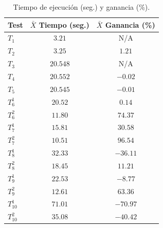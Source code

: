 \begin{table}[!htb]
\renewcommand{\arraystretch}{1.3}
\begin{center}
\begin{tabular}{|l|c|c|}
\hline
  \textbf{Test}& \textbf{$\bar{X}$ Tiempo (seg.)} & \textbf{$\bar{X}$ Ganancia (\%)} \\ \hline
   $T_1$ & $3.21$  & N/A\\ \hline 
   $T_2$ & $3.25$  & $1.21$   \\ \hline 
   $T_3$ & $20.548$ & N/A   \\ \hline 
   $T_4$ & $20.552$ & $-0.02$ \\ \hline 
   $T_5$ & $20.545$ & $-0.01$ \\ \hline 
   $T^{1}_6$ & $20.52$  & $0.14$\\ \hline 
   $T^{2}_6$ & $11.80$ & $74.37$\\ \hline 
   $T^{1}_7$ & $15.81$ & $30.58$ \\ \hline 
   \textbf{$T^{2}_7$} & \textbf{$10.51$} & \textbf{$96.54$} \\ \hline
   $T^{1}_8$ & $32.33$ & $-36.11$ \\ \hline 
   $T^{2}_8$ & $18.45$ & $11.21$ \\ \hline 
   $T^{1}_9$ & $22.53$ & $-8.77$ \\ \hline 
   $T^{2}_9$ & $12.61$ & $63.36$ \\ \hline 
   \textbf{$T^{1}_{10}$} & \textbf{$71.01$} & $-70.97$ \\ \hline 
   $T^{2}_{10}$ & $35.08$ & $-40.42$ \\ \hline 
  \hline
  \end{tabular}
  \caption{Tiempo de ejecución (seg.) y ganancia (\%).}
  \label{tabla:tests-agregado}
  \end{center}
\end{table} 



